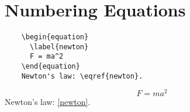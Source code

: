 \section{Numbering Equations}
\begin{tcolorbox}
  \begin{lstlisting}
    \begin{equation}
      \label{newton}
      F = ma^2
    \end{equation}
    Newton's law: \eqref{newton}.
  \end{lstlisting}
  \begin{equation}
    \label{newton}
    F = ma^2
  \end{equation}
  Newton's law: \eqref{newton}.

\end{tcolorbox}


